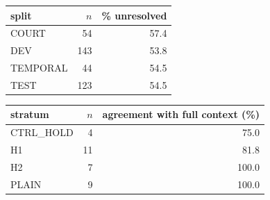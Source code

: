 \begin{table}[t]
\centering
\begin{minipage}[t]{0.46\textwidth}
\centering\small
\begin{tabular}{lrr}
\toprule
split & $n$ & \% unresolved \\
\midrule
COURT & 54 & 57.4 \\
DEV & 143 & 53.8 \\
TEMPORAL & 44 & 54.5 \\
TEST & 123 & 54.5 \\
\bottomrule
\end{tabular}
\label{tab:splits}
\end{minipage}\hfill
\begin{minipage}[t]{0.50\textwidth}
\centering\small
\begin{tabular}{lrr}
\toprule
stratum & $n$ & agreement with full context (\%) \\
\midrule
CTRL\_HOLD & 4 & 75.0 \\
H1 & 11 & 81.8 \\
H2 & 7 & 100.0 \\
PLAIN & 9 & 100.0 \\
\bottomrule
\end{tabular}
\label{tab:humanabl}
\end{minipage}
\end{table}
